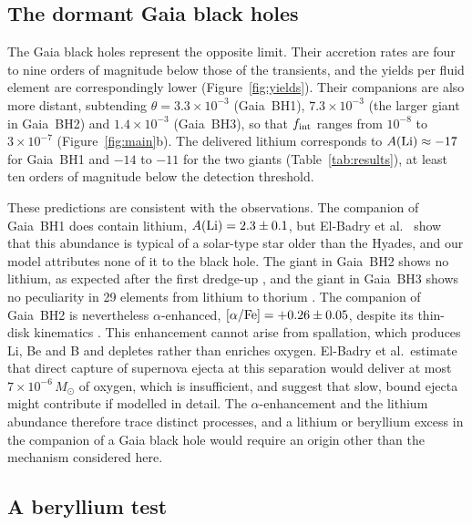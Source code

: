\documentclass[twocolumn,showpacs,preprintnumbers,amsmath,amssymb]{revtex4}
\begin{document}
\subsection{The dormant Gaia black holes}

The Gaia black holes represent the opposite limit. Their accretion rates are four to nine orders of magnitude below those of the transients, and the yields per fluid element are correspondingly lower (Figure~\ref{fig:yields}). Their companions are also more distant, subtending $\theta = 3.3\times10^{-3}$ (Gaia~BH1), $7.3\times10^{-3}$ (the larger giant in Gaia~BH2) and $1.4\times10^{-3}$ (Gaia~BH3), so that $f_{\rm int}$ ranges from $10^{-8}$ to $3\times10^{-7}$ (Figure~\ref{fig:main}b). The delivered lithium corresponds to $A({\rm Li})\approx-17$ for Gaia~BH1 and $-14$ to $-11$ for the two giants (Table~\ref{tab:results}), at least ten orders of magnitude below the detection threshold.

These predictions are consistent with the observations. The companion of Gaia~BH1 does contain lithium, $A({\rm Li})=2.3\pm0.1$, but El-Badry et al.\ \cite{ElBadry_2023} show that this abundance is typical of a solar-type star older than the Hyades, and our model attributes none of it to the black hole. The giant in Gaia~BH2 shows no lithium, as expected after the first dredge-up \cite{ElBadry2023BH2}, and the giant in Gaia~BH3 shows no peculiarity in 29 elements from lithium to thorium \cite{Hackshaw2025}. The companion of Gaia~BH2 is nevertheless $\alpha$-enhanced, $[\alpha/{\rm Fe}] = +0.26\pm0.05$, despite its thin-disk kinematics \cite{ElBadry2023BH2}. This enhancement cannot arise from spallation, which produces Li, Be and B and depletes rather than enriches oxygen. El-Badry et al.\ estimate that direct capture of supernova ejecta at this separation would deliver at most $7\times10^{-6}\,M_\odot$ of oxygen, which is insufficient, and suggest that slow, bound ejecta might contribute if modelled in detail. The $\alpha$-enhancement and the lithium abundance therefore trace distinct processes, and a lithium or beryllium excess in the companion of a Gaia black hole would require an origin other than the mechanism considered here.

\subsection{A beryllium test}
\end{document}
